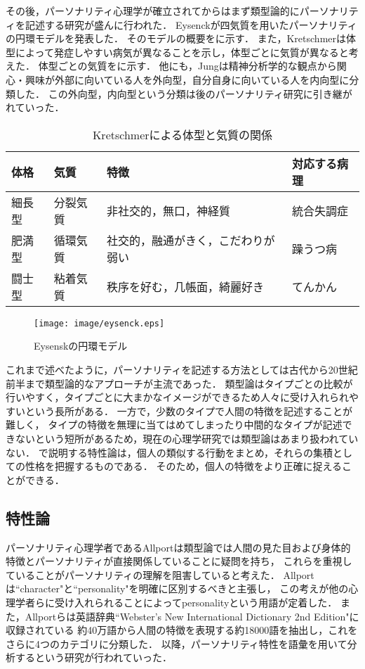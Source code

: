 その後，パーソナリティ心理学が確立されてからはまず類型論的にパーソナリティを記述する研究が盛んに行われた．
Eysenck\cite{eysenck-1963}が四気質を用いたパーソナリティの円環モデルを発表した．
そのモデルの概要をに示す．
また，Kretschmer\cite{kretschmer}は体型によって発症しやすい病気が異なることを示し，体型ごとに気質が異なると考えた．
体型ごとの気質をに示す．
他にも，Jung\cite{jung}は精神分析学的な観点から関心・興味が外部に向いている人を外向型，自分自身に向いている人を内向型に分類した．
この外向型，内向型という分類は後のパーソナリティ研究に引き継がれていった．

\begin{table}[htb]
    \centering
    \caption{Kretschmerによる体型と気質の関係}
    \begin{tabular}{llll} \hline
        体格 & 気質 & 特徴 & 対応する病理 \\ \hline
        細長型 & 分裂気質 & 非社交的，無口，神経質 & 統合失調症 \\
        肥満型 & 循環気質 & 社交的，融通がきく，こだわりが弱い & 躁うつ病 \\
        闘士型 & 粘着気質 & 秩序を好む，几帳面，綺麗好き & てんかん \\ \hline
    \end{tabular}
    \label{tab:kretschmer}
\end{table}

\begin{figure}[htb]
    \centering
    \texttt{[image: image/eysenck.eps]}
    \caption{Eysenskの円環モデル}
    \label{fig:eysenck}
\end{figure}

これまで述べたように，パーソナリティを記述する方法としては古代から20世紀前半まで類型論的なアプローチが主流であった．
類型論はタイプごとの比較が行いやすく，タイプごとに大まかなイメージができるため人々に受け入れられやすいという長所がある．
一方で，少数のタイプで人間の特徴を記述することが難しく，
タイプの特徴を無理に当てはめてしまったり中間的なタイプが記述できないという短所があるため，現在の心理学研究では類型論はあまり扱われていない．
で説明する特性論は，個人の類似する行動をまとめ，それらの集積としての性格を把握するものである．
そのため，個人の特徴をより正確に捉えることができる．

\subsection{特性論}
\label{sec:trait}
パーソナリティ心理学者であるAllportは類型論では人間の見た目および身体的特徴とパーソナリティが直接関係していることに疑問を持ち，
これらを重視していることがパーソナリティの理解を阻害していると考えた．
Allport\cite{allport}は“character"と“personality"を明確に区別するべきと主張し，
この考えが他の心理学者らに受け入れられることによってpersonalityという用語が定着した．
また，Allportら\cite{allport_odbert}は英語辞典“Webster's New International Dictionary 2nd Edition"に収録されている
約40万語から人間の特徴を表現する約18000語を抽出し，これをさらに4つのカテゴリに分類した．
以降，パーソナリティ特性を語彙を用いて分析するという研究が行われていった．

